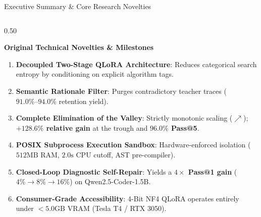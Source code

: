 \documentclass[aspectratio=169,10pt]{beamer}
\begin{document}
\begin{frame}{Executive Summary \& Core Research Novelties}
\begin{columns}[T]
    \begin{column}{0.50\textwidth}
      \begin{exampleblock}{\textbf{Original Technical Novelties \& Milestones}}
        \begin{enumerate}\itemsep=1.8pt\scriptsize
          \item \textbf{Decoupled Two-Stage QLoRA Architecture}: Reduces categorical search entropy by conditioning on explicit algorithm tags.
          \item \textbf{Semantic Rationale Filter}: Purges contradictory teacher traces ($91.0\%\text{--}94.0\%$ retention yield).
          \item \textbf{Complete Elimination of the Valley}: Strictly monotonic scaling ($\nearrow$); \textbf{$+128.6\%$ relative gain} at the trough and \textbf{$96.0\%$ Pass@5}.
          \item \textbf{POSIX Subprocess Execution Sandbox}: Hardware-enforced isolation ($512\text{MB}$ RAM, $2.0\text{s}$ CPU cutoff, AST pre-compiler).
          \item \textbf{Closed-Loop Diagnostic Self-Repair}: Yields a \textbf{$4\times$ Pass@1 gain} ($4\%\to 8\%\to 16\%$) on Qwen2.5-Coder-1.5B.
          \item \textbf{Consumer-Grade Accessibility}: 4-Bit NF4 QLoRA operates entirely under $<5.0\text{GB}$ VRAM (Tesla T4 / RTX 3050).
        \end{enumerate}
      \end{exampleblock}
    \end{column}
  \end{columns}
\end{frame}
\end{document}
